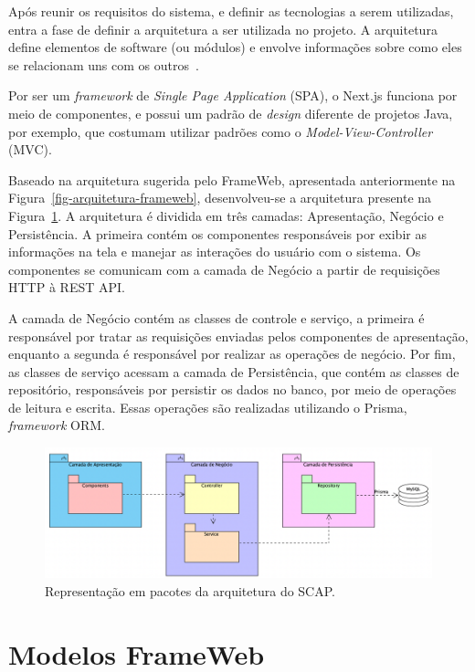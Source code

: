 Após reunir os requisitos do sistema, e definir as tecnologias a serem utilizadas, entra a fase 
de definir a arquitetura a ser utilizada no projeto. A arquitetura define elementos
de software (ou módulos) e envolve informações sobre como eles se relacionam uns com os outros~\cite{falbo:2018}.

Por ser um \textit{framework} de \textit{Single Page Application} (SPA), o Next.js funciona por meio de componentes,
e possui um padrão de \textit{design} diferente de projetos Java, por exemplo, que costumam utilizar
padrões como o \textit{Model-View-Controller} (MVC). 

Baseado na arquitetura sugerida pelo FrameWeb, apresentada anteriormente na Figura~\ref{fig-arquitetura-frameweb}, 
desenvolveu-se a arquitetura presente na Figura~\ref{fig-arquitetura}.
A arquitetura é dividida em três camadas: Apresentação, Negócio e Persistência.
A primeira contém os componentes responsáveis por exibir as informações na tela e manejar as interações do usuário
com o sistema. Os componentes se comunicam com a camada de Negócio a partir de requisições HTTP à REST API.

A camada de Negócio contém as classes de controle e serviço, a primeira é responsável por tratar as requisições
enviadas pelos componentes de apresentação, enquanto a segunda é responsável por realizar as operações de negócio.
Por fim, as classes de serviço acessam a camada de Persistência, que contém as classes de repositório, responsáveis por
persistir os dados no banco, por meio de operações de leitura e escrita. Essas operações são realizadas utilizando o Prisma,
\textit{framework} ORM.

\begin{figure}[h!]
    \centering
    \includegraphics[width=\textwidth]{figuras/fig-arquitetura.png}
    \caption{Representação em pacotes da arquitetura do SCAP.}
    \label{fig-arquitetura}
\end{figure}


\section{Modelos FrameWeb}
\label{sec-projeto-frameweb}

